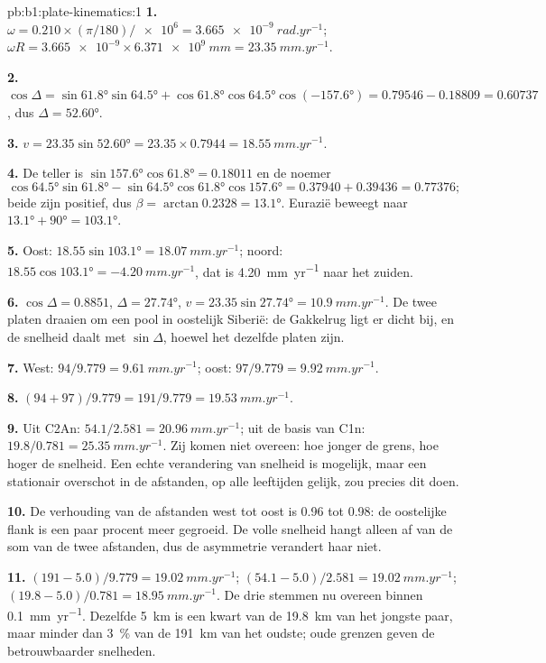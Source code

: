 \begin{solution}{pb:b1:plate-kinematics:1}
\textbf{1.} $\omega = 0.210\times(\pi/180)/\num{e6} = \qty{3.665e-9}{rad.yr^{-1}}$;
$\omega R = \num{3.665e-9}\times\qty{6.371e9}{mm} = \qty{23.35}{mm.yr^{-1}}$.

\textbf{2.} $\cos\Delta = \sin\ang{61.8}\sin\ang{64.5} + \cos\ang{61.8}
\cos\ang{64.5}\cos(\ang{-157.6}) = 0.79546 - 0.18809 = 0.60737$, dus
$\Delta = \ang{52.60}$.

\textbf{3.} $v = 23.35\sin\ang{52.60} = 23.35\times0.7944 =
\qty{18.55}{mm.yr^{-1}}$.

\textbf{4.} De teller is $\sin\ang{157.6}\cos\ang{61.8} = 0.18011$ en de noemer
\[
  \cos\ang{64.5}\sin\ang{61.8} - \sin\ang{64.5}\cos\ang{61.8}\cos\ang{157.6} =
  0.37940 + 0.39436 = 0.77376;
\]
beide zijn positief, dus $\beta = \arctan 0.2328 =
\ang{13.1}$. Eurazië beweegt naar $\ang{13.1} + \ang{90} = \ang{103.1}$.

\textbf{5.} Oost: $18.55\sin\ang{103.1} = \qty{18.07}{mm.yr^{-1}}$; noord:
$18.55\cos\ang{103.1} = \qty{-4.20}{mm.yr^{-1}}$, dat is \qty{4.20}{mm.yr^{-1}}
naar het zuiden.

\textbf{6.} $\cos\Delta = 0.8851$, $\Delta = \ang{27.74}$, $v = 23.35
\sin\ang{27.74} = \qty{10.9}{mm.yr^{-1}}$. De twee platen draaien om een pool in oostelijk Siberië: de Gakkelrug ligt er dicht bij, en de snelheid daalt met $\sin\Delta$, hoewel het dezelfde platen zijn.

\textbf{7.} West: $94/9.779 = \qty{9.61}{mm.yr^{-1}}$; oost: $97/9.779 =
\qty{9.92}{mm.yr^{-1}}$.

\textbf{8.} $(94 + 97)/9.779 = 191/9.779 = \qty{19.53}{mm.yr^{-1}}$.

\textbf{9.} Uit C2An: $54.1/2.581 = \qty{20.96}{mm.yr^{-1}}$; uit de basis van
C1n: $19.8/0.781 = \qty{25.35}{mm.yr^{-1}}$. Zij komen niet overeen: hoe jonger de grens, hoe hoger de snelheid. Een echte verandering van snelheid is mogelijk, maar een stationair overschot in de afstanden, op alle leeftijden gelijk, zou precies dit doen.

\textbf{10.} De verhouding van de afstanden west tot oost is 0.96 tot 0.98: de oostelijke flank is een paar procent meer gegroeid. De volle snelheid hangt alleen af van de som van de twee afstanden, dus de asymmetrie verandert haar niet.

\textbf{11.} $(191 - 5.0)/9.779 = \qty{19.02}{mm.yr^{-1}}$;
$(54.1 - 5.0)/2.581 = \qty{19.02}{mm.yr^{-1}}$; $(19.8 - 5.0)/0.781 =
\qty{18.95}{mm.yr^{-1}}$. De drie stemmen nu overeen binnen \qty{0.1}{mm.yr^{-1}}. Dezelfde \qty{5}{km} is een kwart van de \qty{19.8}{km} van het jongste paar, maar minder dan \qty{3}{\percent} van de \qty{191}{km} van het oudste; oude grenzen geven de betrouwbaarder snelheden.


\end{solution}
